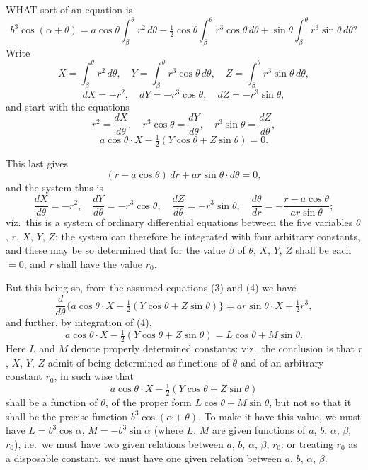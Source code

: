 \documentclass[11pt,a4paper]{article}
\begin{document}
WHAT sort of an equation is
\begin{equation}
b^3 \cos(\alpha + \theta) = a\cos\theta \int_\beta^\theta r^2\,d\theta - \tfrac{1}{2}\cos\theta \int_\beta^\theta r^3\cos\theta\,d\theta + \sin\theta \int_\beta^\theta r^3\sin\theta\,d\theta \tag{1}?
\end{equation}
Write
\begin{equation}
X = \int_\beta^\theta r^2\,d\theta,\quad Y = \int_\beta^\theta r^3\cos\theta\,d\theta,\quad Z = \int_\beta^\theta r^3\sin\theta\,d\theta \tag{2},
\end{equation}
\begin{equation}
dX = -r^2,\quad dY = -r^3\cos\theta,\quad dZ = -r^3\sin\theta \tag{3},
\end{equation}
and start with the equations
\[
r^2 = \frac{dX}{d\theta},\quad r^3\cos\theta = \frac{dY}{d\theta},\quad r^3\sin\theta = \frac{dZ}{d\theta},
\]
\begin{equation}
a\cos\theta \cdot X - \tfrac{1}{2}(Y\cos\theta + Z\sin\theta) = 0 \tag{4}.
\end{equation}

This last gives
\begin{equation}
(r - a\cos\theta)\,dr + ar\sin\theta \cdot d\theta = 0 \tag{5},
\end{equation}
and the system thus is
\[
\frac{dX}{d\theta} = -r^2,\quad \frac{dY}{d\theta} = -r^3\cos\theta,\quad \frac{dZ}{d\theta} = -r^3\sin\theta,\quad \frac{d\theta}{dr} = -\frac{r-a\cos\theta}{ar\sin\theta};
\]
viz.\ this is a system of ordinary differential equations between the five variables $\theta$, $r$, $X$, $Y$, $Z$: the system can therefore be integrated with four arbitrary constants, and these may be so determined that for the value $\beta$ of $\theta$, $X$, $Y$, $Z$ shall be each $=0$; and $r$ shall have the value $r_0$.

But this being so, from the assumed equations (3) and (4) we have
\[
\frac{d}{d\theta}\{a\cos\theta \cdot X - \tfrac{1}{2}(Y\cos\theta + Z\sin\theta)\} = ar\sin\theta \cdot X + \tfrac{1}{2}r^3,
\]
and further, by integration of (4),
\[
a\cos\theta \cdot X - \tfrac{1}{2}(Y\cos\theta + Z\sin\theta) = L\cos\theta + M\sin\theta.
\]
Here $L$ and $M$ denote properly determined constants: viz.\ the conclusion is that $r$, $X$, $Y$, $Z$ admit of being determined as functions of $\theta$ and of an arbitrary constant $r_0$, in such wise that
\[
a\cos\theta \cdot X - \tfrac{1}{2}(Y\cos\theta + Z\sin\theta)
\]
shall be a function of $\theta$, of the proper form $L\cos\theta + M\sin\theta$, but not so that it shall be the precise function $b^3\cos(\alpha + \theta)$. To make it have this value, we must have $L = b^3\cos\alpha$, $M = -b^3\sin\alpha$ (where $L$, $M$ are given functions of $a$, $b$, $\alpha$, $\beta$, $r_0$), i.e.\ we must have two given relations between $a$, $b$, $\alpha$, $\beta$, $r_0$: or treating $r_0$ as a disposable constant, we must have one given relation between $a$, $b$, $\alpha$, $\beta$.
\end{document}
